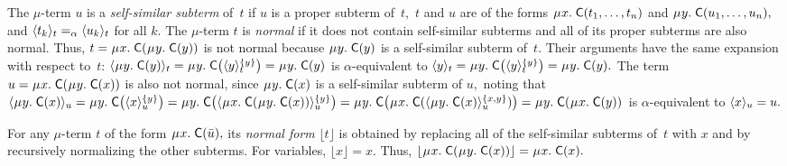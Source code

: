 \documentclass[smallcondensed,draft]{svjour3}
\newcommand\MU{\vvthinspace\mu\vvthinspace}
\newcommand\const[1]{\textsf{#1}}
\renewcommand{\vec}[1]{\bar #1}
\newcommand{\expand}[2]{\langle \smash{#2} \rangle_{#1}}
\newcommand{\nf}[1]{\lfloor#1\rfloor}
\newcommand{\aequiv}{\mathrel{=_\alpha}}
\newcommand{\vsim}{\aequiv}
\newcommand\vvthinspace{\kern+0.041667em}
\newcommand\vthinspace{\kern+0.083333em}
\begin{document}
The $\mu$-term $u$
is a \emph{self-similar subterm} of~$t$ if
$u$ is a proper subterm of~$t,$
$t$ and $u$ are of the forms $\MU x.\; \const{C}( t_1, \ldots, t_n )$
and $\MU y.\; \const{C}( u_1, \ldots, u_n ),$
and $\expand{t}{ t_k } \aequiv \expand{t}{ u_k }$ for all $k.$ %
The $\mu$-term $t$ is \emph{normal} if it does not contain %
self-similar subterms
and all of its proper subterms are also normal.
Thus, $t = \MU x.\; \const{C}( \MU y.\; \const{C}( y ) )$ is not normal
because $\MU y.\; \const{C}( y )$ is a self-similar subterm of~$t.$
Their arguments have the same expansion with respect to~$t$:
$\expand{t}{\MU y.\; \const{C}( y )} =
\MU y.\; \const{C}\bigl( \expand{t}{y}^{\smash{\{y\}}} \bigr) =
\MU y.\; \const{C}( y )$
is $\alpha$-equivalent to
$\expand{t}{y} =
\MU y.\; \const{C}\bigl( \expand{t}{y}^{\smash{\{y\}}} \bigr) =
\MU y.\; \const{C}( y ).$
The term $u = \MU x.\; \const{C}( \MU y.\; \const{C}( x ) )$ is also not normal,
since $\MU y.\; \const{C}( x )$ is a self-similar subterm of $u,$
noting that
%
$\expand{u}{\MU y.\; \const{C}( x )}
 = \MU y.\; \const{C}\bigl( \expand{u}{x}^{\smash{\{y\}}} \bigr)
 = \MU y.\; \const{C}\bigl( \expand{u}{\MU x.\allowbreak\; \const{C}( \MU y.\allowbreak\; \const{C}( x ) ) }^{\smash{\{y\}}} \bigr)
 = \MU y.\; \const{C}\bigl( \MU x.\allowbreak\; \const{C}( \expand{u}{\MU y.\allowbreak\; \const{C}( x )}^{\smash{\{x,y\}}} ) \bigr)
 = \MU y.\allowbreak\; \const{C}( \MU x.\allowbreak\; \const{C}( y ) )$
is $\alpha$-equivalent to $\expand{u}{x} = u.$

For any $\mu$-term $t$ of the form $\MU x.\; \const C( \vec u ),$
its \emph{normal form} $\nf{t}$ is obtained
by replacing all of the self-similar subterms of~$t$ with $x$
and by recursively normalizing the other subterms.
For variables, $\nf{x} = x.$
Thus, $\nf{\MU x.\; \const{C}( \MU y.\; \const{C}( x ) )} = \MU x.\; \const{C}( x ).$


\end{document}
